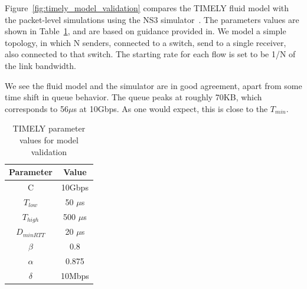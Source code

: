 Figure~\ref{fig:timely_model_validation} compares the TIMELY fluid model with
the packet-level simulations using the NS3 simulator~\cite{ns3}. The parameters
values are shown in Table~\ref{tab:timely_model_validation}, and are based on
guidance provided in\cite{timely}.  We model a simple topology, in which N
senders, connected to a switch, send to a single receiver, also connected to
that switch. The starting rate for each flow is set to be 1/N of the link
bandwidth. 

We see the fluid model and the simulator are in good agreement, apart from some
time shift in queue behavior. The queue peaks at roughly 70KB, which corresponds
to 56$\mu$s at 10Gbps. As one would expect, this is close to the $T_{min}$.

\begin{table}[t]
\small
\center
\begin{tabular}{c|c}
Parameter & Value \\ \hline
C & 10Gbps \\ 
$T_{low}$ & 50 $\mu$s \\ 
$T_{high}$ & 500 $\mu$s \\
$D_{minRTT}$ & 20 $\mu$s \\
$\beta$ & 0.8 \\
$\alpha$ & 0.875 \\
$\delta$ & 10Mbps
\end{tabular}
\caption{TIMELY parameter values for model validation}
\label{tab:timely_model_validation}
\end{table}

